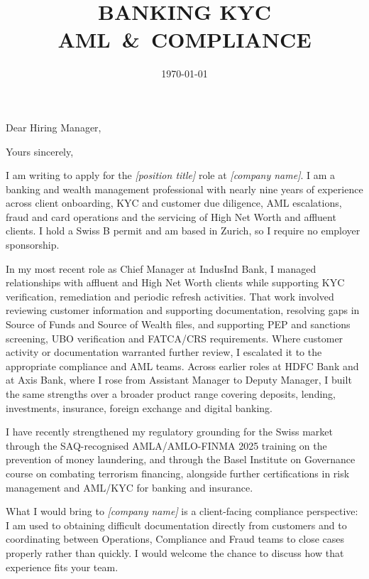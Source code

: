 \documentclass[11pt,a4paper,sans]{moderncv}
\title{BANKING \textbar{} KYC \textbar{} \mbox{AML \& COMPLIANCE}}
\begin{document}
\date{\today}
\opening{Dear Hiring Manager,}
\closing{Yours sincerely,}

\makelettertitle

I am writing to apply for the \emph{[position title]} role at \emph{[company
name]}. I am a banking and wealth management professional with nearly nine years
of experience across client onboarding, KYC and customer due diligence, AML
escalations, fraud and card operations and the servicing of High Net Worth and
affluent clients. I hold a Swiss B permit and am based in Zurich, so I require
no employer sponsorship.

In my most recent role as Chief Manager at IndusInd Bank, I managed
relationships with affluent and High Net Worth clients while supporting KYC
verification, remediation and periodic refresh activities. That work involved
reviewing customer information and supporting documentation, resolving gaps in
Source of Funds and Source of Wealth files, and supporting PEP and sanctions
screening, UBO verification and FATCA/CRS requirements. Where customer activity
or documentation warranted further review, I escalated it to the appropriate
compliance and AML teams. Across earlier roles at HDFC Bank and at Axis
Bank, where I rose from Assistant Manager to Deputy Manager, I built the same
strengths over a broader product range covering deposits, lending, investments,
insurance, foreign exchange and digital banking.

I have recently strengthened my regulatory grounding for the Swiss market
through the SAQ-recognised AMLA/AMLO-FINMA 2025 training on the prevention of
money laundering, and through the Basel Institute on Governance course on
combating terrorism financing, alongside further certifications in risk
management and AML/KYC for banking and insurance.

What I would bring to \emph{[company name]} is a client-facing compliance
perspective: I am used to obtaining difficult documentation directly from
customers and to coordinating between Operations, Compliance and Fraud teams to
close cases properly rather than quickly. I would welcome the chance to discuss
how that experience fits your team.

\makeletterclosing
\end{document}
